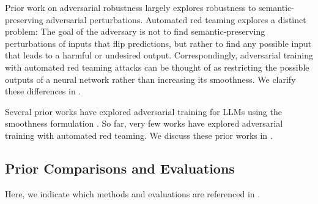 Prior work on adversarial robustness largely explores robustness to semantic-preserving adversarial perturbations. Automated red teaming explores a distinct problem: The goal of the adversary is not to find semantic-preserving perturbations of inputs that flip predictions, but rather to find any possible input that leads to a harmful or undesired output. Correspondingly, adversarial training with automated red teaming attacks can be thought of as restricting the possible outputs of a neural network rather than increasing its smoothness. We clarify these differences in .

Several prior works have explored adversarial training for LLMs using the smoothness formulation \citep{ebrahimi2017hotflip, zhu2019freelb, liu2020adversarial, morris2020textattack}. So far, very few works have explored adversarial training with automated red teaming. We discuss these prior works in .


\subsection{Prior Comparisons and Evaluations}\label{sec:non_overlapping_references}
Here, we indicate which methods and evaluations are referenced in .
